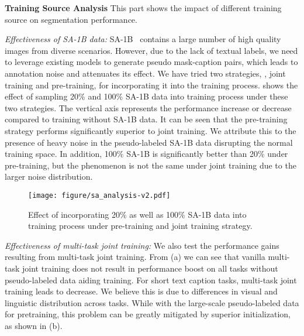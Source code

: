 \documentclass[10pt,twocolumn,letterpaper]{article}
\begin{document}
\vspace{5pt}
\noindent \textbf{Training Source Analysis}
This part shows the impact of different training source on segmentation performance. 

\textit{Effectiveness of SA-1B data:}
SA-1B~\cite{sam} contains a large number of high quality images from diverse scenarios. However, due to the lack of textual labels, we need to leverage existing models to generate pseudo mask-caption pairs, which leads to annotation noise and attenuates its effect. We have tried two strategies, \ie, joint training and pre-training, for incorporating it into the training process. 
 shows the effect of sampling 20\% and 100\% SA-1B data into training process under these two strategies. The vertical axis represents the performance increase or decrease compared to training without SA-1B data. It can be seen that the pre-training strategy performs significantly superior to joint training. We attribute this to the presence of heavy noise in the pseudo-labeled SA-1B data disrupting the normal training space. In addition, 100\% SA-1B is significantly better than 20\%  under pre-training, but the phenomenon is not the same under joint training due to the larger noise distribution.






\begin{figure}[t]
    \centering
    \texttt{[image: figure/sa\_analysis-v2.pdf]}
    \caption{Effect of incorporating 20\% as well as 100\% SA-1B data into training process under pre-training and joint training strategy.}
    \label{fig:sa1b}
    \vspace{-15pt}
\end{figure}

\textit{Effectiveness of multi-task joint training:}
We also test the performance gains resulting from multi-task joint training. From  (a) we can see that vanilla multi-task joint training does not result in performance boost on all tasks without pseudo-labeled data aiding training.
For short text caption tasks, multi-task joint training leads to decrease. 
We believe this is due to differences in visual and linguistic distribution across tasks.
While with the large-scale pseudo-labeled data for pretraining, this problem can be greatly mitigated by superior initialization, as shown in  (b).
\end{document}
